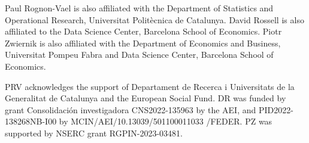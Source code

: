 \documentclass[bj,authoryear]{imsart}
\theoremstyle{plain}
\begin{document}
\begin{acks}[Acknowledgments]
Paul Rognon-Vael is also affiliated with the Department of Statistics and Operational Research, Universitat Politècnica de Catalunya. David Rossell is also affiliated to the Data Science Center, Barcelona School of Economics. Piotr Zwiernik is also affiliated with the Department
of Economics and Business, Universitat Pompeu Fabra and Data Science Center, Barcelona School of
Economics.
\end{acks}
\begin{funding}
PRV acknowledges the support of Departament de Recerca i Universitats de la Generalitat de Catalunya and the European Social Fund. DR was funded by grant Consolidaci\'on investigadora CNS2022-135963 by the AEI, and PID2022-138268NB-I00 by MCIN/AEI/10.13039/501100011033 /FEDER.
PZ was supported by NSERC grant RGPIN-2023-03481.
\end{funding}

\begin{supplement}
\end{supplement}
\end{document}
